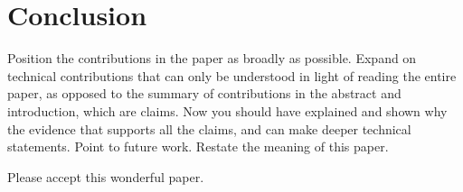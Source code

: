 \section{Conclusion}


Position the contributions in the paper as broadly as possible. Expand
on technical contributions that can only be understood in light of
reading the entire paper, as opposed to the summary of contributions
in the abstract and introduction, which are claims.  Now you should
have explained and shown why the evidence that supports all the
claims, and can make deeper technical statements.  Point to future
work.  Restate the meaning of this paper.

Please accept this wonderful paper.  

